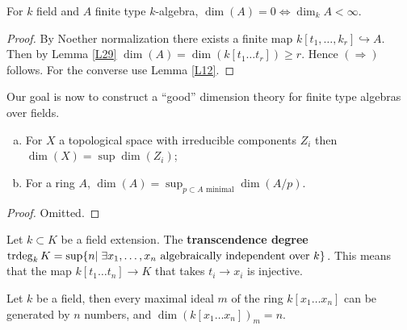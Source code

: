 \documentclass{../mathnotes}
\begin{document}
\begin{lem}
\label{L51}
For $k$ field and $A$ finite type $k$-algebra, $\dim(A) = 0 \Leftrightarrow \dim_k A < \infty$.
\end{lem}

\begin{proof}
By Noether normalization there exists a finite map $k[t_1, \dots, k_r] \hookrightarrow A$. Then by Lemma \ref{L29} $\dim(A) = \dim(k[t_1 \dots t_r]) \geq r$. Hence $(\Rightarrow)$ follows. For the converse use Lemma \ref{L12}.
\end{proof}
Our goal is now to construct a ``good'' dimension theory for finite type algebras over fields.

\begin{lem}\hspace{1mm}
\label{L51}
\begin{enumerate}[(a)]
\item For $X$ a topological space with irreducible components $Z_i$ then $\dim(X) = \sup \dim(Z_i)$;
\item For a ring $A$, $\dim(A) = \sup_{p\subset A \text{ minimal}} \dim(A/p)$.
\end{enumerate}
\end{lem}
\begin{proof}
Omitted.
\end{proof}

\begin{defn}
Let $k\subset K$ be a field extension. The \textbf{transcendence degree} $\operatorname{trdeg}_k K = \sup \{n|\; \exists x_1, \dots, x_n \text{ algebraically independent over } k\}$. This means that the map $k[t_1 \dots t_n] \to K$ that takes $t_i \to x_i$ is injective.
\end{defn}


\begin{lem}
\label{L52}
Let $k$ be a field, then every maximal ideal $m$ of the ring $k[x_1 \dots x_n]$ can be generated by $n$ numbers, and $\dim(k[x_1 \dots x_n])_{m} = n$.
\end{lem}
\end{document}
